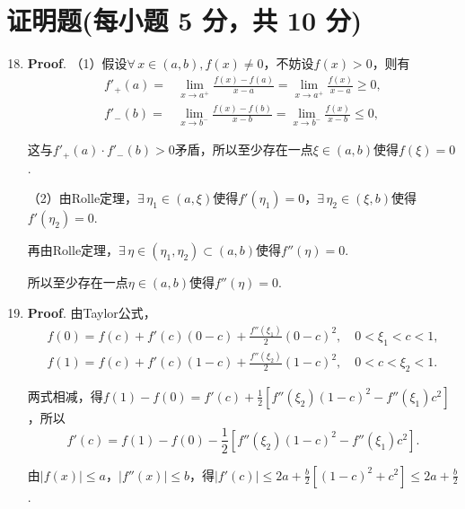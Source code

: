 \documentclass[../Main.tex]{subfiles}
\begin{document}
\section{证明题(每小题 5 分，共 10 分)}
\begin{enumerate}
    \setcounter{enumi}{17}
    \item \textbf{Proof}. （1）假设$\forall\,x\in(a,b),f(x)\neq0$，不妨设$f(
              x)>0$，则有
          \[
              \begin{aligned}
                  f'_{+}(a) = & \lim_{x\to a^+}\frac{f(x)-f(a)}{x-a}=\lim_{x\to a^+}\frac{f(x)}{x-a}\geq0, \\
                  f'_{-}(b) = & \lim_{x\to b^-}\frac{f(x)-f(b)}{x-b}=\lim_{x\to b^-}\frac{f(x)}{x-b}\leq0,
              \end{aligned}
          \]

          这与$f'_{+}(a)\cdot f'_{-}(b)>0$矛盾，所以至少存在一点$\xi\in(a,b)$使得$f(\xi
              )=0$.

          （2）由Rolle定理，$\exists\,\eta_{1}\in(a,\xi)$使得$f'(\eta_{1})=0$，$\exists
              \,\eta_{2}\in(\xi,b)$使得$f'(\eta_{2})=0$.

          再由Rolle定理，$\exists\,\eta\in(\eta_{1},\eta_{2})\subset(a,b)$使得$f''(\eta
              )=0$.

          所以至少存在一点$\eta\in(a,b)$使得$f''(\eta)=0$.

    \item \textbf{Proof}. 由Taylor公式，
          \[
              \begin{gathered}
                  f(0)=f(c)+f'(c)(0-c)+\frac{f''(\xi_{1})}{2}(0-c)^2,\quad 0<\xi_1<c<1,\\
                  f(1)=f(c)+f'(c)(1-c)+\frac{f''(\xi_{2})}{2}(1-c)^2,\quad 0<c<\xi_2<1.
              \end{gathered}
          \]

          两式相减，得$f(1)-f(0)=f'(c)+\frac{1}{2}\left[f''(\xi_{2})(1-c)^{2}-f''(\xi
                  _{1})c^{2}\right]$，所以
          \[
              f'(c)=f(1)-f(0)-\frac{1}{2}\left[f''(\xi_{2})(1-c)^{2}-f''(\xi_{1})c^{2}\right
              ].
          \]

          由$|f(x)|\leq a$，$|f''(x)|\leq b$，得$|f'(c)|\leq 2a+\frac{b}{2}\left[(1-c
                  )^{2}+c^{2}\right]\leq 2a+\frac{b}{2}$.
\end{enumerate}
\end{document}
